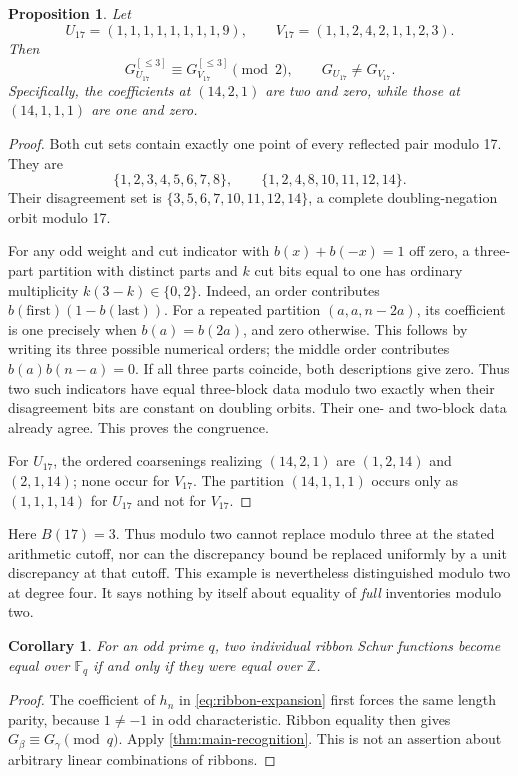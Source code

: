 \documentclass[11pt,a4paper]{amsart}
\numberwithin{equation}{section}
\theoremstyle{plain}
\newtheorem{proposition}[theorem]{Proposition}
\newtheorem{corollary}[theorem]{Corollary}
\theoremstyle{definition}
\newcommand{\Z}{\mathbb Z}
\begin{document}
\begin{proposition}\label{prop:parity}
Let
\[
U_{17}=(1,1,1,1,1,1,1,1,9),\qquad
V_{17}=(1,1,2,4,2,1,1,2,3).
\]
Then
\[
G_{U_{17}}^{[\le3]}\equiv G_{V_{17}}^{[\le3]}\pmod2,
\qquad G_{U_{17}}\ne G_{V_{17}}.
\]
Specifically, the coefficients at \((14,2,1)\) are two and zero,
while those at \((14,1,1,1)\) are one and zero.
\end{proposition}
\begin{proof}
Both cut sets contain exactly one point of every reflected pair modulo
17.  They are
\[
\{1,2,3,4,5,6,7,8\},\qquad
\{1,2,4,8,10,11,12,14\}.
\]
Their disagreement set is
\(\{3,5,6,7,10,11,12,14\}\), a complete doubling-negation orbit modulo 17.

For any odd weight and cut indicator with \(b(x)+b(-x)=1\) off zero,
a three-part partition with distinct parts and \(k\) cut bits equal to one
has ordinary multiplicity \(k(3-k)\in\{0,2\}\).  Indeed, an order contributes
\(b(\text{first})(1-b(\text{last}))\).
For a repeated partition \((a,a,n-2a)\), its coefficient is one precisely
when \(b(a)=b(2a)\), and zero otherwise.  This follows by writing its three
possible numerical orders; the middle order contributes
\(b(a)b(n-a)=0\).  If all three parts coincide, both descriptions give zero.
Thus two such indicators have equal three-block data modulo two exactly
when their disagreement bits are constant on doubling orbits.  Their
one- and two-block data already agree.  This proves the congruence.

For \(U_{17}\), the ordered coarsenings realizing \((14,2,1)\) are
\((1,2,14)\) and \((2,1,14)\); none occur for \(V_{17}\).  The partition
\((14,1,1,1)\) occurs only as \((1,1,1,14)\) for \(U_{17}\) and not for \(V_{17}\).
\end{proof}

Here \(B(17)=3\).  Thus modulo two cannot replace modulo three at the
stated arithmetic cutoff, nor can the discrepancy bound be replaced
uniformly by a unit discrepancy at that cutoff.  This example is
nevertheless distinguished modulo two at degree four.  It says nothing
by itself about equality of \emph{full} inventories modulo two.

\begin{corollary}\label{cor:odd-characteristic}
For an odd prime \(q\), two individual ribbon Schur functions become equal
over \(\mathbb F_q\) if and only if they were equal over \(\Z\).
\end{corollary}
\begin{proof}
The coefficient of \(h_n\) in \eqref{eq:ribbon-expansion} first forces the
same length parity, because \(1\ne-1\) in odd characteristic.  Ribbon
equality then gives \(G_\beta\equiv G_\gamma\pmod q\).  Apply
\cref{thm:main-recognition}.  This is not an assertion about arbitrary
linear combinations of ribbons.
\end{proof}
\end{document}
